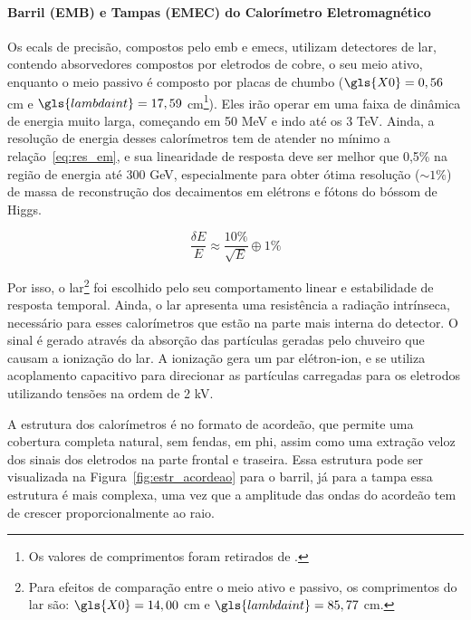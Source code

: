 \paragraph{Barril (EMB) e Tampas (EMEC) do Calorímetro Eletromagnético}
\label{par:ecal_prec}

Os \glspl{ecal} de precisão, compostos pelo \gls{emb} e \glspl{emec}, 
utilizam detectores de \gls{lar}, contendo absorvedores compostos por eletrodos 
de cobre, o seu meio ativo, enquanto o meio passivo é composto por placas de
chumbo ($\gls{X0}=0,56$ cm e $\gls{lambdaint}=17,59$ cm\footnote{Os valores de
comprimentos foram retirados de \cite{pdg_comp}.\label{fn:comp_rad_nucl}}). Eles
irão operar em uma faixa de dinâmica de energia muito larga, começando em 50 MeV
e indo até os 3 TeV. Ainda, a resolução de energia desses calorímetros tem de
atender no mínimo a relação~\ref{eq:res_em}, e sua linearidade de resposta deve ser melhor 
que 0,5\% na região de energia até 300 GeV, especialmente para obter ótima 
resolução ($\sim1\%$) de massa de reconstrução dos decaimentos em elétrons e fótons 
do bóssom de Higgs. 

\begin{equation}\label{eq:res_em}
\frac{\delta E}{E} \approx \frac{10\%}{\sqrt{E}} \oplus 1\%
\end{equation}

Por isso, o \gls{lar}\footnote{Para efeitos de comparação entre o meio ativo e passivo, 
os comprimentos do \gls{lar} são: $\gls{X0}=14,00$ cm e $\gls{lambdaint}=85,77$
cm.} foi escolhido pelo seu comportamento linear e estabilidade de resposta temporal. 
Ainda, o \gls{lar} apresenta uma resistência a radiação intrínseca, necessário
para esses calorímetros que estão na parte mais interna do detector. O sinal é gerado
através da absorção das partículas geradas pelo chuveiro que causam a ionização
do \gls{lar}. A ionização gera um par elétron-ion, e se utiliza acoplamento
capacitivo para direcionar as partículas carregadas para os eletrodos
utilizando tensões na ordem de 2 kV.

A estrutura dos calorímetros é no formato de acordeão, que permite uma cobertura
completa natural, sem fendas, em \gls{phi}, assim como uma extração veloz dos sinais dos eletrodos 
na parte frontal e traseira. Essa estrutura pode ser visualizada na Figura~\ref{fig:estr_acordeao}
para o barril, já para a tampa essa estrutura é mais complexa, uma
vez que a amplitude das ondas do acordeão tem de crescer proporcionalmente ao
raio. 


